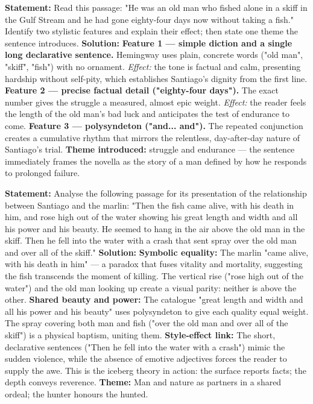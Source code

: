 \documentclass[11pt]{article}
\begin{document}
\begin{exoresolu}
\textbf{Statement:} Read this passage: "He was an old man who fished alone in a skiff in the Gulf Stream and he had gone eighty-four days now without taking a fish." Identify two stylistic features and explain their effect; then state one theme the sentence introduces.
\tcblower
\textbf{Solution:}
\textbf{Feature 1 — simple diction and a single long declarative sentence.} Hemingway uses plain, concrete words ("old man", "skiff", "fish") with no ornament. \emph{Effect:} the tone is factual and calm, presenting hardship without self-pity, which establishes Santiago's dignity from the first line.
\textbf{Feature 2 — precise factual detail ("eighty-four days").} The exact number gives the struggle a measured, almost epic weight. \emph{Effect:} the reader feels the length of the old man's bad luck and anticipates the test of endurance to come.
\textbf{Feature 3 — polysyndeton ("and... and").} The repeated conjunction creates a cumulative rhythm that mirrors the relentless, day-after-day nature of Santiago's trial.
\textbf{Theme introduced:} struggle and endurance — the sentence immediately frames the novella as the story of a man defined by how he responds to prolonged failure.
\end{exoresolu}

\begin{exoresolu}
\textbf{Statement:} Analyse the following passage for its presentation of the relationship between Santiago and the marlin: "Then the fish came alive, with his death in him, and rose high out of the water showing his great length and width and all his power and his beauty. He seemed to hang in the air above the old man in the skiff. Then he fell into the water with a crash that sent spray over the old man and over all of the skiff."
\tcblower
\textbf{Solution:}
\textbf{Symbolic equality:} The marlin "came alive, with his death in him" — a paradox that fuses vitality and mortality, suggesting the fish transcends the moment of killing. The vertical rise ("rose high out of the water") and the old man looking up create a visual parity: neither is above the other.
\textbf{Shared beauty and power:} The catalogue "great length and width and all his power and his beauty" uses polysyndeton to give each quality equal weight. The spray covering both man and fish ("over the old man and over all of the skiff") is a physical baptism, uniting them.
\textbf{Style-effect link:} The short, declarative sentences ("Then he fell into the water with a crash") mimic the sudden violence, while the absence of emotive adjectives forces the reader to supply the awe. This is the iceberg theory in action: the surface reports facts; the depth conveys reverence.
\textbf{Theme:} Man and nature as partners in a shared ordeal; the hunter honours the hunted.
\end{exoresolu}
\end{document}
